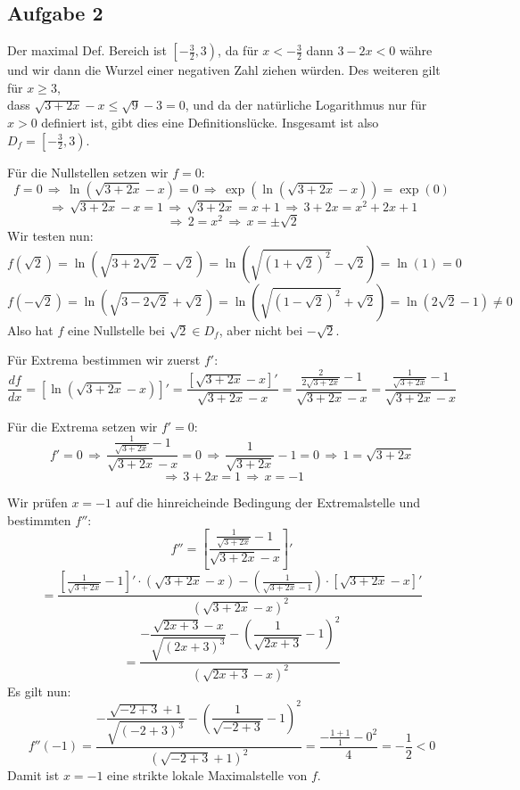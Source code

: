 \documentclass[a4paper,graphics,11pt]{article}
\newcommand{\aufgabe}[1]{\subsection*{Aufgabe #1}}
\begin{document}
\aufgabe{2}
Der maximal Def. Bereich ist $\left[-\frac{3}{2} , 3\right)$, da für $x < - \frac{3}{2}$ dann
$3 - 2x < 0$ währe und wir dann die Wurzel einer negativen Zahl ziehen würden.
Des weiteren gilt für $x \geq 3$,\\ dass $\sqrt{3+2x} - x \leq \sqrt{9} - 3= 0$, und da
der natürliche Logarithmus nur für $x > 0$ definiert ist, gibt dies eine Definitionslücke.
Insgesamt ist also $D_f = \left[-\frac{3}{2}, 3\right)$.

Für die Nullstellen setzen wir $f = 0$:
$$
    f = 0 \,\Longrightarrow\, \ln\left(\sqrt{3+2x}-x\right) = 0
    \,\Longrightarrow\, \exp\left(\ln\left(\sqrt{3+2x}-x\right)\right) = \exp(0)
$$$$
    \,\Longrightarrow\, \sqrt{3+2x} -x = 1 \,\Longrightarrow\, \sqrt{3+2x} = x+1
    \,\Longrightarrow\, 3+2x = x^2+2x+1
$$$$
    \,\Longrightarrow\, 2 = x^2 \,\Longrightarrow\, x = \pm\sqrt{2}
$$
Wir testen nun:
$$
    f(\sqrt{2}) = \ln\left(\sqrt{3+2\sqrt{2}}-\sqrt{2}\right)
    = \ln\left(\sqrt{(1+\sqrt{2})^2} -\sqrt{2}\right)
    = \ln(1) = 0
$$$$
    f(-\sqrt{2}) = \ln\left(\sqrt{3-2\sqrt{2}}+\sqrt{2}\right)
    = \ln\left(\sqrt{(1-\sqrt{2})^2} +\sqrt{2}\right)
    = \ln(2\sqrt{2}-1) \neq 0
$$
Also hat $f$ eine Nullstelle bei $\sqrt{2} \in D_f$, aber nicht bei $-\sqrt{2}$.

Für Extrema bestimmen wir zuerst $f'\colon$
$$
    \frac{df}{dx} = \left[\ln\left(\sqrt{3+2x}-x\right)\right]'
    = \frac{\left[\sqrt{3+2x}-x\right]'}{\sqrt{3+2x} -x}
    = \frac{\frac{2}{2\sqrt{3+2x}}-1}{\sqrt{3+2x} -x}
    = \frac{\frac{1}{\sqrt{3+2x}}-1}{\sqrt{3+2x}-x}
$$

Für die Extrema setzen wir $f' = 0\colon$
$$
    f'=0 \,\Longrightarrow\, \frac{\frac{1}{\sqrt{3+2x}} -1}{\sqrt{3+2x} -x} = 0
    \,\Longrightarrow\, \frac{1}{\sqrt{3+2x}} -1 = 0
    \,\Longrightarrow\, 1 = \sqrt{3+2x}
$$$$
    \,\Longrightarrow\, 3+2x = 1
    \,\Longrightarrow\, x = -1
$$

Wir prüfen $x=-1$ auf die hinreicheinde Bedingung der Extremalstelle und bestimmten $f''$:
$$
    f'' = \left[\frac{\frac{1}{\sqrt{3+2x}}-1}{\sqrt{3+2x} -x}\right]'
$$$$
    = \frac{\left[\frac{1}{\sqrt{3+2x}} -1\right]'\cdot \left(\sqrt{3+2x}-x\right)
        - \left(\frac{1}{\sqrt{3+2x}-1}\right) \cdot \left[\sqrt{3+2x}-x\right]'}
        {\left(\sqrt{3+2x} -x\right)^2}
$$$$
    = \frac{-\dfrac{\sqrt{2x+3} -x}{\sqrt{(2x+3)^3}}
        - \left(\dfrac{1}{\sqrt{2x+3}}-1\right)^2}{\left(\sqrt{2x+3}-x\right)^2}
$$
Es gilt nun:
$$
    f''(-1) = \frac{-\dfrac{\sqrt{-2+3} +1}{\sqrt{(-2+3)^3}}
        - \left(\dfrac{1}{\sqrt{-2+3}}-1\right)^2}{\left(\sqrt{-2+3}+1\right)^2}
    = \frac{-\frac{1+1}{1} - 0^2}{4} = -\frac{1}{2} < 0
$$
Damit ist $x = -1$ eine strikte lokale Maximalstelle von $f$.
\end{document}
